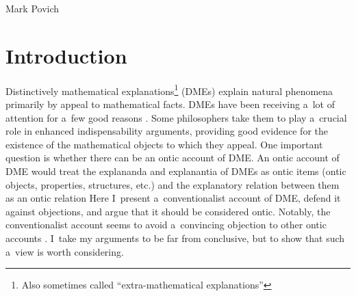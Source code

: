 \begin{artengenv}{Mark Povich}
\section{Introduction}
\lettrine[loversize=0.13,lines=2,lraise=-0.03,nindent=0em,findent=0.2pt]%
{D}{}istinctively mathematical explanations\footnote{Also sometimes called ``extra-mathematical explanations''
 } (DMEs) explain natural phenomena primarily by appeal to mathematical facts. DMEs have been receiving a~lot of attention for a~few good reasons 
\parencites[][]{steiner_mathematics_1978}[][]{colyvan_can_1998}[][]{baker_are_2005}[][]{baker_mathematical_2009}
[][]{mancosu_mathematical_2008}
[][]{saatsi_enhanced_2011}[][]{saatsi_mathematics_2012}[][]{saatsi_indispensable_2016}
[][]{lyon_mathematical_2012}
[][]{lange_what_2013}[][]{lange_because_2016}[][]{lange_reply_2018}
[][]{pincock_abstract_2015}[][]{reutlinger_is_2016}[][]{craver_directionality_2017}
[][]{povich_modality_2020}[][]{povich_narrow_2021}. %
 Some philosophers 
 take them to play a~crucial role in enhanced indispensability arguments, providing good evidence for the existence of the mathematical objects to which they appeal. One important question is whether there can be an ontic account of DME. An ontic account of DME would treat the explananda and explanantia of DMEs as ontic items (ontic objects, properties, structures, etc.) and the explanatory relation between them as an ontic relation 
 Here I~present a~conventionalist account of DME, defend it against objections, and argue that it should be considered ontic. Notably, the conventionalist account seems to avoid a~convincing objection to other ontic accounts 
\parencite[][]{kuorikoski_there_2021}. %
 I~take my arguments to be far from conclusive, but to show that such a~view is worth considering.


\end{artengenv}
